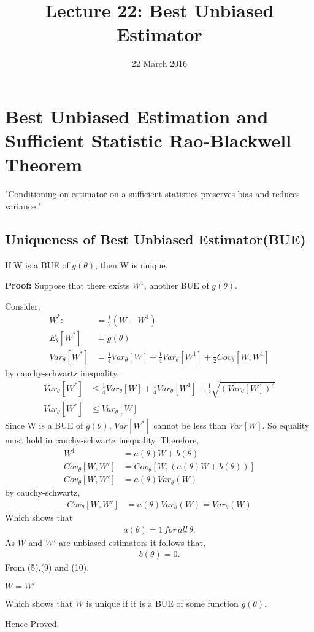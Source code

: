 \documentclass[a4paper,english,12pt]{article}
\begin{document}
\title{Lecture 22: Best Unbiased Estimator}
\date{22 March 2016}
\author{}
\maketitle
\section{Best Unbiased Estimation and Sufficient Statistic Rao-Blackwell Theorem}
"Conditioning on estimator on a sufficient statistics preserves bias and reduces variance."
\subsection{Uniqueness of Best Unbiased Estimator(BUE)}
\begin{thm} 
If W is a BUE of $g(\theta)$, then W is unique.
\end{thm}
\begin{flushleft}
\textbf{Proof:} Suppose that there exists $W^1$, another BUE of $g(\theta)$.
\end{flushleft}
Consider, 
\begin{align}
W^*:&=\frac{1}{2}(W+W^1)\\
E_\theta[W^*] &= g(\theta)\\
Var_\theta[W^*] &= \frac{1}{4}Var_\theta[W]+\frac{1}{4}Var_\theta[W^1]+\frac{1}{2}Cov_\theta[W,W^1]
\end{align}
by cauchy-schwartz inequality,
\begin{align}
\nonumber
Var_\theta[W^*]&\leq\frac{1}{4}Var_\theta[W]+\frac{1}{4}Var_\theta[W^1]+\frac{1}{2}\sqrt{(Var_\theta[W])^2}\\
Var_\theta[W^*]&\leq Var_\theta[W]
\end{align}
Since W is a BUE of $g(\theta)$, $Var[W^*]$ cannot be less than $Var[W]$.
So equality must hold in  cauchy-schwartz inequality. Therefore,\\
\begin{align}
W^1&=a(\theta) W + b(\theta)\\
Cov_\theta[W,W']&=Cov_\theta[W,(a(\theta)W+b(\theta))]\\
Cov_\theta[W,W']&=a(\theta)Var_\theta(W)
\end{align}
by cauchy-schwartz,
\begin{align}
Cov_\theta[W,W']&=a(\theta)Var_\theta(W)=Var_\theta(W)
\end{align}
Which shows that 
\begin{align}
a(\theta)=1\, for \,all \,\theta.
\end{align}
As $W$ and $W'$ are unbiased estimators it follows that,
\begin{align}
b(\theta)=0. 
\end{align}
From (5),(9) and (10),\\
\begin{center}
$W=W'$
\end{center}
Which shows that $W$ is unique if it is a BUE of some function $g(\theta).$
\begin{center}
Hence Proved.
\end{center}
\end{document}
